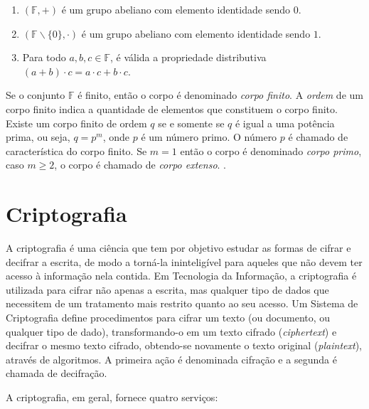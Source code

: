 \begin{enumerate}
\item $(\mathbb{F}, +)$ é um grupo abeliano com elemento identidade sendo \(0\).
\item $(\mathbb{F} \backslash \{0\}, \cdot)$ é um grupo abeliano com elemento identidade sendo $1$.
\item Para todo $a, b, c \in \mathbb{F}$, é válida a propriedade distributiva $(a + b) \cdot c = a \cdot c + b \cdot c$.
\end{enumerate}

Se o conjunto \(\mathbb{F}\) é finito, então o corpo é denominado \textit{corpo finito}. A \textit{ordem} de um corpo finito indica a quantidade de elementos que constituem o corpo finito. Existe um corpo finito de ordem \(q\) se e somente se \(q\) é igual a uma potência prima, ou seja, $q = p^{m}$, onde \(p\) é um número primo. O número \(p\) é chamado de característica do corpo finito. Se $m = 1$ então o corpo é denominado \textit{corpo primo}, caso $m \geq 2$, o corpo é chamado de \textit{corpo extenso}. \cite{Guide}.

%
%
\section{Criptografia} \label{sec:criptografia}
A criptografia é uma ciência que tem por objetivo estudar as formas de cifrar e decifrar a escrita, de modo a torná-la ininteligível para aqueles que não devem ter acesso à informação nela contida. Em Tecnologia da Informação, a criptografia é utilizada para cifrar não apenas a escrita, mas qualquer tipo de dados que necessitem de um tratamento mais restrito quanto ao seu acesso. Um Sistema de Criptografia define procedimentos para cifrar um texto (ou documento, ou qualquer tipo de dado), transformando-o em um texto cifrado (\textit{ciphertext}) e decifrar o mesmo texto cifrado, obtendo-se novamente o texto original (\textit{plaintext}), através de algoritmos. A primeira ação é denominada cifração e a segunda é chamada de decifração. \cite{Portnoi:2005}

A criptografia, em geral, fornece quatro serviços: \cite{Portnoi:2005}

